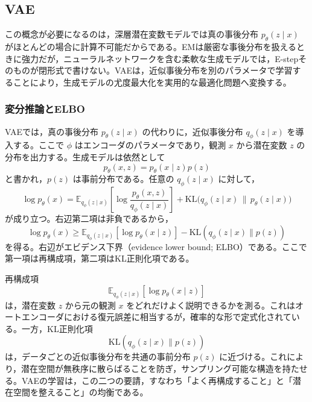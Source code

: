 \subsection{VAE}

この概念が必要になるのは，深層潜在変数モデルでは真の事後分布 \(p_{\theta}(z \mid x)\) がほとんどの場合に計算不可能だからである。EMは厳密な事後分布を扱えるときに強力だが，ニューラルネットワークを含む柔軟な生成モデルでは，E-stepそのものが閉形式で書けない。VAE\cite{Kingma2014,Rezende2014}は，近似事後分布を別のパラメータで学習することにより，生成モデルの尤度最大化を実用的な最適化問題へ変換する。

\subsubsection{変分推論とELBO}

VAEでは，真の事後分布 \(p_{\theta}(z \mid x)\) の代わりに，近似事後分布 \(q_{\phi}(z \mid x)\) を導入する。ここで \(\phi\) はエンコーダのパラメータであり，観測 \(x\) から潜在変数 \(z\) の分布を出力する。生成モデルは依然として
\begin{equation}
p_{\theta}(x,z)=p_{\theta}(x \mid z)p(z)
\end{equation}
と書かれ，\(p(z)\) は事前分布である。任意の \(q_{\phi}(z \mid x)\) に対して，
\begin{equation}
\log p_{\theta}(x)
=
\mathbb{E}_{q_{\phi}(z \mid x)}
\left[
\log \frac{p_{\theta}(x,z)}{q_{\phi}(z \mid x)}
\right]
+
\mathrm{KL}\bigl(q_{\phi}(z \mid x)\,\|\,p_{\theta}(z \mid x)\bigr)
\end{equation}
が成り立つ。右辺第二項は非負であるから，
\begin{equation}
\log p_{\theta}(x) \ge
\mathbb{E}_{q_{\phi}(z \mid x)}[\log p_{\theta}(x \mid z)]
- \mathrm{KL}(q_{\phi}(z \mid x)\|p(z))
\end{equation}
を得る。右辺がエビデンス下界（evidence lower bound; ELBO）である。ここで第一項は再構成項，第二項はKL正則化項である。

再構成項
\begin{equation}
\mathbb{E}_{q_{\phi}(z \mid x)}[\log p_{\theta}(x \mid z)]
\end{equation}
は，潜在変数 \(z\) から元の観測 \(x\) をどれだけよく説明できるかを測る。これはオートエンコーダにおける復元誤差に相当するが，確率的な形で定式化されている。一方，KL正則化項
\begin{equation}
\mathrm{KL}(q_{\phi}(z \mid x)\|p(z))
\end{equation}
は，データごとの近似事後分布を共通の事前分布 \(p(z)\) に近づける。これにより，潜在空間が無秩序に散らばることを防ぎ，サンプリング可能な構造を持たせる。VAEの学習は，この二つの要請，すなわち「よく再構成すること」と「潜在空間を整えること」の均衡である。


